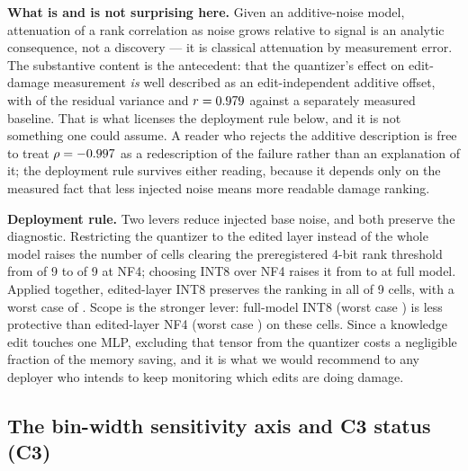 \documentclass[preprint,12pt]{elsarticle}
\begin{document}
\textbf{What is and is not surprising here.} Given an additive-noise model, attenuation
of a rank correlation as noise grows relative to signal is an analytic consequence, not
a discovery --- it is classical attenuation by measurement error. The substantive
content is the antecedent: that the quantizer's effect on edit-damage measurement
\emph{is} well described as an edit-independent additive offset, with
\pAddShareNfFM{} of the residual variance and $r=0.979{}$ against a separately
measured baseline. That is what licenses the deployment rule below, and it is not
something one could assume. A reader who rejects the additive description is free to
treat $\rho=-0.997{}$ as a redescription of the failure rather than an explanation
of it; the deployment rule survives either reading, because it depends only on the
measured fact that less injected noise means more readable damage ranking.

\textbf{Deployment rule.} Two levers reduce injected base noise, and both preserve the
diagnostic. Restricting the quantizer to the edited layer instead of the whole model
raises the number of cells clearing the preregistered 4-bit rank threshold from
\pNPassNfFM{} of 9 to \pNPassNfEL{} of 9 at NF4; choosing INT8 over NF4 raises it from
\pNPassNfFM{} to \pNPassIntFM{} at full model. Applied together, edited-layer INT8
preserves the ranking in all \pNPassIntEL{} of 9 cells, with a worst case of
\pMinFlatIntEL{}. Scope is the stronger lever: full-model INT8
(worst case \pMinFlatIntFM{}) is less protective than edited-layer NF4
(worst case \pMinFlatNfEL{}) on these cells. Since a knowledge edit touches one MLP,
excluding that tensor from the quantizer costs a negligible fraction of the memory
saving, and it is what we would recommend to any deployer who intends to keep
monitoring which edits are doing damage.

\subsection{The bin-width sensitivity axis and C3 status (C3)}
\label{sec:c3}
\end{document}
